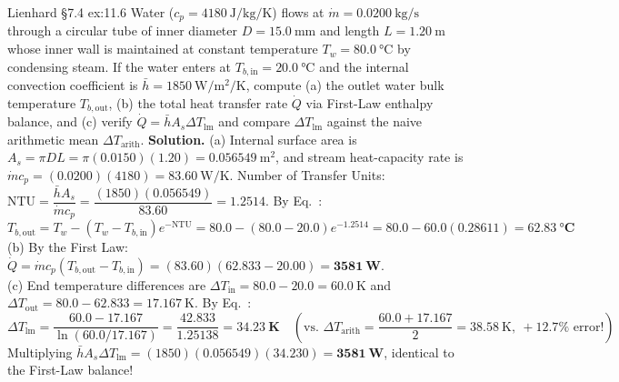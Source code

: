 \begin{workedexample}{Lienhard §7.4 }{ex:11.6}
Water ($c_p = \SI{4180}{\joule\per\kilogram\per\kelvin}$) flows at $\dot{m} = \SI{0.0200}{\kilogram\per\second}$ through a circular tube of inner diameter $D = \SI{15.0}{\milli\meter}$ and length $L = \SI{1.20}{\meter}$ whose inner wall is maintained at constant temperature $T_w = \SI{80.0}{\celsius}$ by condensing steam. If the water enters at $T_{b,\mathrm{in}} = \SI{20.0}{\celsius}$ and the internal convection coefficient is $\bar{h} = \SI{1850}{\watt\per\square\meter\per\kelvin}$, compute (a) the outlet water bulk temperature $T_{b,\mathrm{out}}$, (b) the total heat transfer rate $\dot{Q}$ via First-Law enthalpy balance, and (c) verify $\dot{Q} = \bar{h} A_s \Delta T_{\mathrm{lm}}$ and compare $\Delta T_{\mathrm{lm}}$ against the naive arithmetic mean $\Delta T_{\mathrm{arith}}$.
\tcblower
\textbf{Solution.} (a) Internal surface area is $A_s = \pi D L = \pi(0.0150)(1.20) = \SI{0.056549}{\square\meter}$, and stream heat-capacity rate is $\dot{m}c_p = (0.0200)(4180) = \SI{83.60}{\watt\per\kelvin}$. Number of Transfer Units: $\mathrm{NTU} = \dfrac{\bar{h}A_s}{\dot{m}c_p} = \dfrac{(1850)(0.056549)}{83.60} = \mathbf{1.2514}$. By Eq.~:
\[
  T_{b,\mathrm{out}} = T_w - \left(T_w - T_{b,\mathrm{in}}\right)e^{-\mathrm{NTU}} = 80.0 - (80.0 - 20.0)e^{-1.2514} = 80.0 - 60.0(0.28611) = \mathbf{\SI{62.83}{\celsius}}
\]
(b) By the First Law: $\dot{Q} = \dot{m}c_p(T_{b,\mathrm{out}} - T_{b,\mathrm{in}}) = (83.60)(62.833 - 20.00) = \mathbf{\SI{3581}{\watt}}$.\\
(c) End temperature differences are $\Delta T_{\mathrm{in}} = 80.0 - 20.0 = \SI{60.0}{\kelvin}$ and $\Delta T_{\mathrm{out}} = 80.0 - 62.833 = \SI{17.167}{\kelvin}$. By Eq.~:
\[
  \Delta T_{\mathrm{lm}} = \frac{60.0 - 17.167}{\ln(60.0 / 17.167)} = \frac{42.833}{1.25138} = \mathbf{\SI{34.23}{\kelvin}} \quad \left(\text{vs.\ } \Delta T_{\mathrm{arith}} = \frac{60.0 + 17.167}{2} = \SI{38.58}{\kelvin},\ +12.7\%\text{ error!}\right)
\]
Multiplying $\bar{h}A_s\Delta T_{\mathrm{lm}} = (1850)(0.056549)(34.230) = \mathbf{\SI{3581}{\watt}}$, identical to the First-Law balance!
\end{workedexample}

